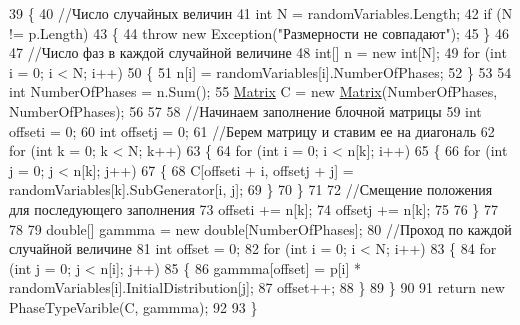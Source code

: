 \begin{DoxyCode}
39         \{
40             \textcolor{comment}{//Число случайных величин }
41             \textcolor{keywordtype}{int} N = randomVariables.Length;
42             \textcolor{keywordflow}{if} (N != p.Length)
43             \{
44                 \textcolor{keywordflow}{throw} \textcolor{keyword}{new} Exception(\textcolor{stringliteral}{"Размерности не совпадают"});
45             \}
46 
47             \textcolor{comment}{//Число фаз в каждой случайной величине}
48             \textcolor{keywordtype}{int}[] n = \textcolor{keyword}{new} \textcolor{keywordtype}{int}[N];
49             \textcolor{keywordflow}{for} (\textcolor{keywordtype}{int} i = 0; i < N; i++)
50             \{
51                 n[i] = randomVariables[i].NumberOfPhases;
52             \}
53 
54             \textcolor{keywordtype}{int} NumberOfPhases = n.Sum();
55             \hyperlink{class_b_l_a_s_1_1_matrix}{Matrix} C = \textcolor{keyword}{new} \hyperlink{class_b_l_a_s_1_1_matrix}{Matrix}(NumberOfPhases, NumberOfPhases);
56 
57 
58             \textcolor{comment}{//Начинаем заполнение блочной матрицы}
59             \textcolor{keywordtype}{int} offseti = 0;
60             \textcolor{keywordtype}{int} offsetj = 0;
61             \textcolor{comment}{//Берем матрицу и ставим ее на диагональ}
62             \textcolor{keywordflow}{for} (\textcolor{keywordtype}{int} k = 0; k < N; k++)
63             \{
64                 \textcolor{keywordflow}{for} (\textcolor{keywordtype}{int} i = 0; i < n[k]; i++)
65                 \{
66                     \textcolor{keywordflow}{for} (\textcolor{keywordtype}{int} j = 0; j < n[k]; j++)
67                     \{
68                         C[offseti + i, offsetj + j] = randomVariables[k].SubGenerator[i, j];
69                     \}
70                 \}
71 
72                 \textcolor{comment}{//Смещение положения для последующего заполнения }
73                 offseti += n[k];
74                 offsetj += n[k];
75 
76             \}
77 
78 
79             \textcolor{keywordtype}{double}[] gammma = \textcolor{keyword}{new} \textcolor{keywordtype}{double}[NumberOfPhases];
80             \textcolor{comment}{//Проход по каждой случайной величине }
81             \textcolor{keywordtype}{int} offset = 0;
82             \textcolor{keywordflow}{for} (\textcolor{keywordtype}{int} i = 0; i < N; i++)
83             \{
84                 \textcolor{keywordflow}{for} (\textcolor{keywordtype}{int} j = 0; j < n[i]; j++)
85                 \{
86                     gammma[offset] = p[i] * randomVariables[i].InitialDistribution[j];
87                     offset++;
88                 \}
89             \}
90 
91             \textcolor{keywordflow}{return} \textcolor{keyword}{new} PhaseTypeVarible(C, gammma);
92 
93         \}
\end{DoxyCode}
